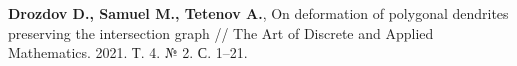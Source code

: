 \begin{thebibliography}{99}











%
    
    
\bigskip \bigskip


\bigskip \bigskip

{\bf Drozdov D., Samuel M., Tetenov A.},
On deformation of polygonal dendrites preserving the intersection graph //
The Art of Discrete and Applied Mathematics. 2021. Т. 4. № 2. С. 1--21.


\end{thebibliography}

